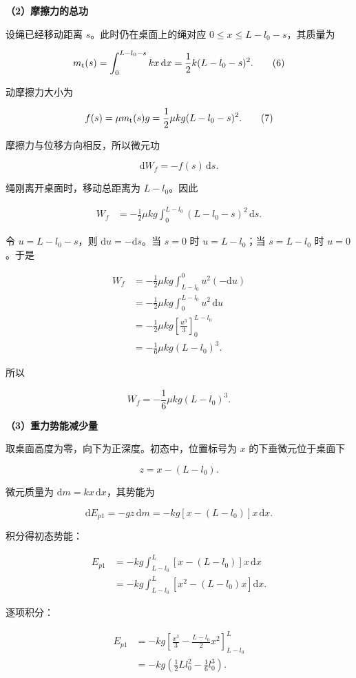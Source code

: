 \documentclass[12pt,a4paper,UTF8]{ctexart}
\begin{document}
\textbf{（2）摩擦力的总功}

设绳已经移动距离 \(s\)。此时仍在桌面上的绳对应
\(0\le x\le L-l_0-s\)，其质量为

\[
m_{\rm t}(s)
=\int_0^{L-l_0-s}kx\,\mathrm dx
=\frac12k(L-l_0-s)^2.
\tag{6}
\]

动摩擦力大小为

\[
f(s)=\mu m_{\rm t}(s)g
=\frac12\mu kg(L-l_0-s)^2.
\tag{7}
\]

摩擦力与位移方向相反，所以微元功

\[
\mathrm dW_f=-f(s)\,\mathrm ds.
\]

绳刚离开桌面时，移动总距离为 \(L-l_0\)。因此

\[
\begin{aligned}
W_f
&=-\frac12\mu kg
\int_0^{L-l_0}(L-l_0-s)^2\,\mathrm ds.
\end{aligned}
\]

令 \(u=L-l_0-s\)，则 \(\mathrm du=-\mathrm ds\)。当 \(s=0\) 时
\(u=L-l_0\)；当 \(s=L-l_0\) 时 \(u=0\)。于是

\[
\begin{aligned}
W_f
&=-\frac12\mu kg
\int_{L-l_0}^{0}u^2(-\mathrm du)\\
&=-\frac12\mu kg
\int_0^{L-l_0}u^2\,\mathrm du\\
&=-\frac12\mu kg
\left[\frac{u^3}{3}\right]_0^{L-l_0}\\
&=-\frac16\mu kg(L-l_0)^3.
\end{aligned}
\]

所以

\[
\boxed{W_f=-\frac16\mu kg(L-l_0)^3}.
\tag{8}
\]

\textbf{（3）重力势能减少量}

取桌面高度为零，向下为正深度。初态中，位置标号为 \(x\)
的下垂微元位于桌面下

\[
z=x-(L-l_0).
\]

微元质量为 \(\mathrm dm=kx\,\mathrm dx\)，其势能为

\[
\mathrm dE_{p1}
=-gz\,\mathrm dm
=-kg[x-(L-l_0)]x\,\mathrm dx.
\]

积分得初态势能：

\[
\begin{aligned}
E_{p1}
&=-kg\int_{L-l_0}^{L}
[x-(L-l_0)]x\,\mathrm dx\\
&=-kg\int_{L-l_0}^{L}
\left[x^2-(L-l_0)x\right]\mathrm dx.
\end{aligned}
\]

逐项积分：

\[
\begin{aligned}
E_{p1}
&=-kg\left[
\frac{x^3}{3}-\frac{L-l_0}{2}x^2
\right]_{L-l_0}^{L}\\
&=-kg\left(\frac12Ll_0^2-\frac16l_0^3\right).
\end{aligned}
\tag{9}
\]
\end{document}
